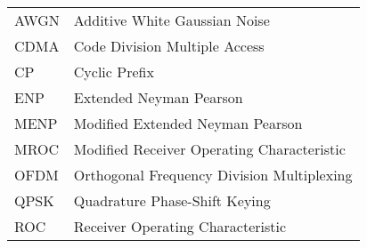 \documentclass [12pt,letterpaper]{report}
\begin{document}
\begin{longtable}{ll}
  AWGN    &   Additive White Gaussian Noise\\
  CDMA    &   Code Division Multiple Access\\
  CP      &   Cyclic Prefix\\
  ENP     &   Extended Neyman Pearson\\
  MENP    &   Modified Extended Neyman Pearson\\
  MROC    &   Modified Receiver Operating Characteristic\\
  OFDM    &   Orthogonal Frequency Division Multiplexing\\
  QPSK    &   Quadrature Phase-Shift Keying         \\
  ROC     &   Receiver Operating Characteristic
\end{longtable}

\cleardoublepage
{}

\typeout{}


\typeout{}


\typeout{}


\typeout{}


\typeout{}

\typeout{}


\appendix

\typeout{}


\typeout{}
\begin{singlespace}
  
  
\end{singlespace}
\end{document}

